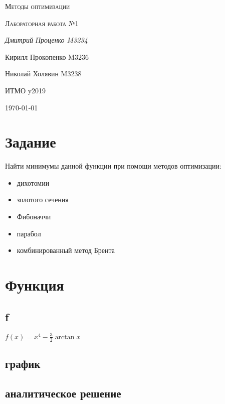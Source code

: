\documentclass[russian, english]{article}
\begin{document}
\begin{titlepage}
\centering
	{\scshape\LARGE Методы оптимизации \par}
	\vspace{1cm}
	{\scshape\Large Лабораторная работа №1\par}
	\vspace{2cm}
	{\Large\itshape Дмитрий Проценко M3234 \par
	Кирилл Прокопенко M3236 \par
	Николай Холявин M3238 \par}
	\vfill
	ИТМО y2019
	\vfill
	{\large \today\par}
\end{titlepage}

\tableofcontents
\newpage

\section{Задание}
Найти минимумы данной функции при помощи методов оптимизации:
\begin{itemize}
\item дихотомии
\item золотого сечения
\item Фибоначчи
\item парабол
\item комбинированный метод Брента
\end{itemize}

\section{Функция}
\subsection{f}
$f(x)=x^4-\frac{3}{2}\arctan{x}$

\subsection{график}
\par
{}

\subsection{аналитическое решение}
\end{document}
